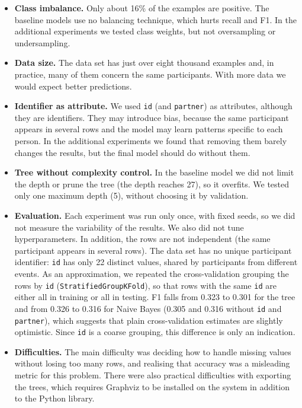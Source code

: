 \documentclass[12pt,a4paper]{article}
\newcommand{\code}[1]{\texttt{#1}}
\begin{document}
\begin{itemize}
  \item \textbf{Class imbalance.} Only about 16\% of the examples are positive. The baseline models use no balancing technique, which hurts recall and F1. In the additional experiments we tested class weights, but not oversampling or undersampling.
  \item \textbf{Data size.} The data set has just over eight thousand examples and, in practice, many of them concern the same participants. With more data we would expect better predictions.
  \item \textbf{Identifier as attribute.} We used \code{id} (and \code{partner}) as attributes, although they are identifiers. They may introduce bias, because the same participant appears in several rows and the model may learn patterns specific to each person. In the additional experiments we found that removing them barely changes the results, but the final model should do without them.
  \item \textbf{Tree without complexity control.} In the baseline model we did not limit the depth or prune the tree (the depth reaches 27), so it overfits. We tested only one maximum depth (5), without choosing it by validation.
  \item \textbf{Evaluation.} Each experiment was run only once, with fixed seeds, so we did not measure the variability of the results. We also did not tune hyperparameters. In addition, the rows are not independent (the same participant appears in several rows). The data set has no unique participant identifier: \code{id} has only 22 distinct values, shared by participants from different events. As an approximation, we repeated the cross-validation grouping the rows by \code{id} (\code{StratifiedGroupKFold}), so that rows with the same \code{id} are either all in training or all in testing. F1 falls from 0.323 to 0.301 for the tree and from 0.326 to 0.316 for Naive Bayes (0.305 and 0.316 without \code{id} and \code{partner}), which suggests that plain cross-validation estimates are slightly optimistic. Since \code{id} is a coarse grouping, this difference is only an indication.
  \item \textbf{Difficulties.} The main difficulty was deciding how to handle missing values without losing too many rows, and realising that accuracy was a misleading metric for this problem. There were also practical difficulties with exporting the trees, which requires Graphviz to be installed on the system in addition to the Python library.
\end{itemize}
\end{document}
